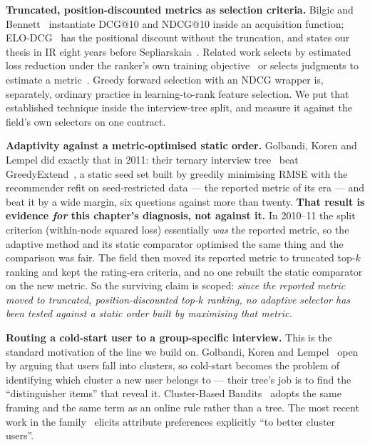\documentclass[11pt]{article}
\begin{document}
\textbf{Truncated, position-discounted metrics as selection criteria.}
Bilgic and Bennett~\cite{bilgic2012activequery} instantiate DCG@10 and NDCG@10 inside an
acquisition function; ELO-DCG~\cite{long2010elodcg} has the positional discount without the
truncation, and states our thesis in IR eight years before
Sepliarskaia~\cite{sepliarskaia2018spq}. Related work selects by estimated loss reduction under the
ranker's own training objective~\cite{donmez2008rankal} or selects judgments to estimate a
metric~\cite{carterette2006minimal}. Greedy forward selection with an NDCG wrapper is, separately,
ordinary practice in learning-to-rank feature selection. We put that established technique inside the
interview-tree split, and measure it against the field's own selectors on one contract.

\textbf{Adaptivity against a metric-optimised static order.} Golbandi,
Koren and Lempel did exactly that in 2011: their ternary interview tree~\cite{golbandi2011adaptive}
beat GreedyExtend~\cite{golbandi2010bootstrapping}, a static seed set built by greedily minimising
RMSE with the recommender refit on seed-restricted data --- the reported metric of its era --- and
beat it by a wide margin, six questions against more than twenty. \textbf{That result is evidence
\emph{for} this chapter's diagnosis, not against it.} In 2010--11 the split criterion (within-node
squared loss) essentially \emph{was} the reported metric, so the adaptive method and its static
comparator optimised the same thing and the comparison was fair. The field then moved its reported
metric to truncated top-$k$ ranking and kept the rating-era criteria, and no one rebuilt the static
comparator on the new metric. So the surviving claim is scoped: \emph{since the reported metric moved
to truncated, position-discounted top-$k$ ranking, no adaptive selector has been tested against a
static order built by maximising that metric.}

\textbf{Routing a cold-start user to a group-specific interview.} This is the
standard motivation of the line we build on. Golbandi, Koren and
Lempel~\cite{golbandi2011adaptive} open by arguing that users fall into clusters, so cold-start
becomes the problem of identifying which cluster a new user belongs to --- their tree's job is to
find the ``distinguisher items'' that reveal it. Cluster-Based Bandits~\cite{shams2021clusterbandits}
adopts the same framing and the same term as an online rule rather than a tree. The most recent work
in the family~\cite{pairwise2025attribute} elicits attribute preferences explicitly ``to better
cluster users''.
\end{document}
